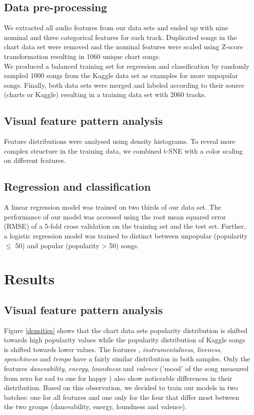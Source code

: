 \documentclass{article}
\begin{document}
\subsection{Data pre-processing}
We extracted all audio features from our data sets and ended up with nine nominal and three categorical features for each track. 
Duplicated songs in the chart data set were removed and the nominal features were scaled using Z-score transformation resulting in 1060 unique chart songs. \\
We produced a balanced training set for regression and classification by randomly sampled 1000 songs from the Kaggle data set as examples for more unpopular songs.
Finally, both data sets were merged and labeled according to their source (charts or Kaggle) resulting in a training data set with 2060 tracks.

\subsection{Visual feature pattern analysis}
Feature distributions were analysed using density histograms. To reveal more complex structure in the training data, we combined t-SNE with a color scaling on different features. 

\subsection{Regression and classification}
A linear regression model was trained on two thirds of our data set. 
The performance of our model was accessed using the root mean squared error (RMSE) of a 5-fold cross validation on the training set and the test set. 
Further, a logistic regression model was trained to distinct between unpopular (popularity $\leq$ 50) and popular (popularity > 50) songs.

\section{Results}

\subsection{Visual feature pattern analysis}
Figure \ref{densities} shows that the chart data sets popularity distribution is shifted towards high popularity values while the popularity distribution of Kaggle songs is shifted towards lower values. The features , \textit{instrumentalness}, \textit{liveness}, \textit{speachiness} and \textit{tempo} have a fairly similar distribution in both samples. 
Only the features \textit{danceability}, \textit{energy}, \textit{loundness} and \textit{valence} ('mood' of the song measured from zero for sad to one for happy \cite{Spotify_developers}) also show noticeable differences in their distribution.
Based on this observation, we decided to train our models in two batches: one for all features and one only for the four that differ most between the two groups (danceability, energy, loundness and valence).
\end{document}
